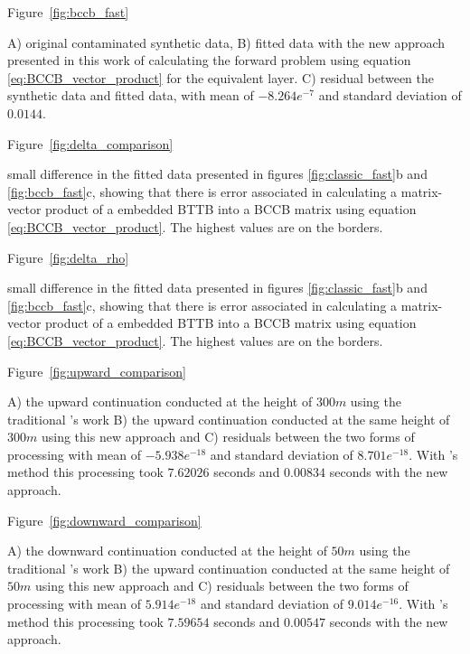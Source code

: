 \documentclass[paper]{geophysics}
\begin{document}
Figure~\ref{fig:bccb_fast}

{A) original contaminated synthetic data, B) fitted data with the new approach presented in this work of calculating the forward problem using equation \ref{eq:BCCB_vector_product} for the equivalent layer. C) residual between the synthetic data and fitted data, with mean of $-8.264e^{-7}$ and standard deviation of $0.0144$.}
\newpage

Figure~\ref{fig:delta_comparison}

{small difference in the fitted data presented in figures \ref{fig:classic_fast}b and \ref{fig:bccb_fast}c, showing that there is error associated in calculating a matrix-vector product of a embedded BTTB into a BCCB matrix using equation \ref{eq:BCCB_vector_product}. The highest values are on the borders.}
\newpage

Figure~\ref{fig:delta_rho}

{small difference in the fitted data presented in figures \ref{fig:classic_fast}b and \ref{fig:bccb_fast}c, showing that there is error associated in calculating a matrix-vector product of a embedded BTTB into a BCCB matrix using equation \ref{eq:BCCB_vector_product}. The highest values are on the borders.}
\newpage

Figure~\ref{fig:upward_comparison}

{A) the upward continuation conducted at the height of $300 m$ using the traditional \cite{siqueira2017fast}'s work B) the upward continuation conducted at the same height of $300 m$ using this new approach and C) residuals between the two forms of processing with mean of $-5.938e^{-18}$ and standard deviation of $8.701e^{-18}$. With \cite{siqueira2017fast}'s method this processing took $7.62026$ seconds and $0.00834$ seconds with the new approach.}
\newpage

Figure~\ref{fig:downward_comparison}

{A) the downward continuation conducted at the height of $50 m$ using the traditional \cite{siqueira2017fast}'s work B) the upward continuation conducted at the same height of $50 m$ using this new approach and C) residuals between the two forms of processing with mean of $5.914e^{-18}$ and standard deviation of $9.014e^{-16}$. With \cite{siqueira2017fast}'s method this processing took $7.59654$ seconds and $0.00547$ seconds with the new approach.}
\newpage
\end{document}

